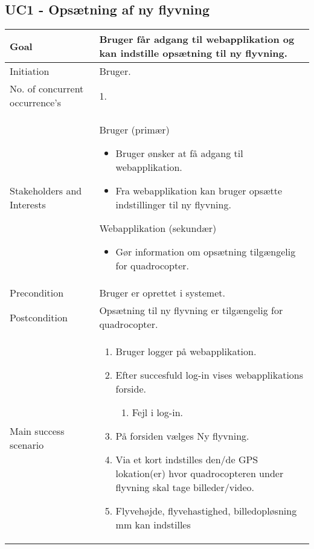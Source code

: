 \subsection*{UC1 - Opsætning af ny flyvning}

\begin{table}[H]
\begin{tabular}{|l|p{10cm}|}
\hline

Goal	 								& Bruger får adgang til webapplikation og kan indstille opsætning til ny flyvning. \\\hline
Initiation 							& Bruger. \\\hline
No. of concurrent occurrence’s		& 1. \\\hline
Stakeholders	and Interests			& Bruger (primær) 
										\begin{itemize}
											\item Bruger ønsker at få adgang til webapplikation.
											\item Fra webapplikation kan bruger opsætte indstillinger til ny flyvning.
										\end{itemize} 
									  Webapplikation (sekundær)
										\begin{itemize}
											\item Gør information om opsætning tilgængelig for quadrocopter.
										\end{itemize} \\\hline
Precondition							& Bruger er oprettet i systemet. \\\hline
Postcondition						& Opsætning til ny flyvning er tilgængelig for quadrocopter. \\\hline
Main success scenario				&
 
									\renewcommand{\labelenumi}{\arabic{enumi}.}
									\renewcommand{\labelenumii}{\Roman{enumii}:}

									\begin{enumerate}[topsep=0.0cm, leftmargin=0.5cm]
										\item Bruger logger på webapplikation.
										\item Efter succesfuld log-in vises webapplikations forside.
											\begin{enumerate}[partopsep=4cm, topsep=0cm, leftmargin=1cm]
												\item Fejl i log-in.
											\end{enumerate}
										\item På forsiden vælges Ny flyvning.
										\item Via et kort indstilles den/de GPS lokation(er) hvor quadrocopteren under flyvning skal tage billeder/video.	
										\item Flyvehøjde, flyvehastighed, billedopløsning mm kan indstilles
									\end{enumerate} \\\hline	


\end{tabular}
\end{table}
